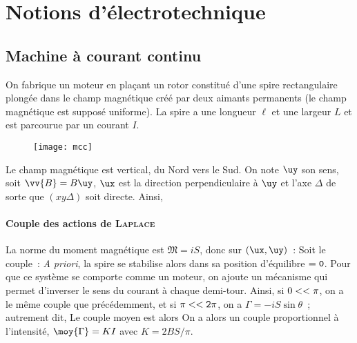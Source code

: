 \documentclass[../main/main.tex]{subfiles}
\begin{document}
\section{Notions d'électrotechnique}
\label{sec:notelectrotech}
\subsection{Machine à courant continu}
\label{ssec:mcc}
On fabrique un moteur en plaçant un rotor constitué d'une spire rectangulaire
plongée dans le champ magnétique créé par deux aimants permanents (le champ
magnétique est supposé uniforme). La spire a une longueur $\ell $ et une largeur
$L$ et est parcourue par un courant $I$.
\begin{figure}[h]
	\centering
	\texttt{[image: mcc]}
	\label{fig:mcc}
\end{figure}
Le champ magnétique est vertical, du Nord vers le Sud. On note $\uy$ son sens,
soit $\vv{B} = B\uy$, $\ux$ est la direction perpendiculaire à $\uy$ et l'axe
$\Delta{}$ de sorte que $(xy\Delta)$ soit directe. Ainsi,

\paragraph*{Couple des actions de \textsc{Laplace}}
La norme du moment magnétique est $\mathfrak{M} = iS$, donc sur $(\ux,\uy)$~:
Soit le couple~:
\textit{A priori}, la spire se stabilise alors dans sa position d'équilibre $\tt
	= 0$. Pour que ce système se comporte comme un moteur, on ajoute un mécanisme
qui permet d'inverser le sens du courant à chaque demi-tour. Ainsi, si $0 < \tt
	< \pi$, on a le même couple que précédemment, et si $\pi < \tt < 2\pi$, on a
$\Gamma = -iS\sin{\theta}$~; autrement dit,
Le couple moyen est alors
On a alors un couple proportionnel à l'intensité, $\moy{\Gamma} = KI$ avec $K
	= 2BS/\pi$.
\end{document}
